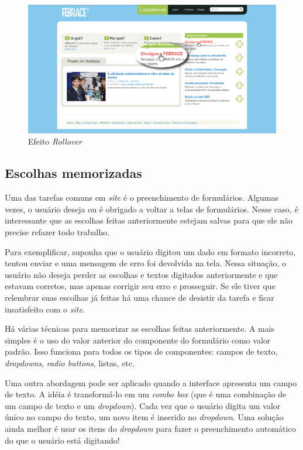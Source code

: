     \begin{figure}[h]
        \begin{center}
    \includegraphics[width=1.0\linewidth]{arquivos/rollover_effect.png}
        \end{center}
        \caption{Efeito \textit{Rollover}}
        \label{rollover_effect}
    \end{figure}

\subsection{Escolhas memorizadas}

Uma das tarefas comuns em \textit{site} é o preenchimento de formulários. Algumas vezes, o usuário deseja ou é obrigado a voltar a telas de formulários. Nesse caso, é interessante que as escolhas feitas anteriormente estejam salvas para que ele não precise refazer todo trabalho. 

Para exemplificar, suponha que o usuário digitou um dado em formato incorreto, tentou enviar e uma mensagem de erro foi devolvida na tela. Nessa situação, o usuário não deseja perder as escolhas e textos digitados anteriormente e que estavam corretos, mas apenas corrigir seu erro e prosseguir. Se ele tiver que relembrar suas escolhas já feitas há uma chance de desistir da tarefa e ficar insatisfeito com o \textit{site}.

Há várias técnicas para memorizar as escolhas feitas anteriormente. A mais simples é o uso do valor anterior do componente do formulário como valor padrão. Isso funciona para todos os tipos de componentes: campos de texto, \textit{dropdowns}, \textit{radio buttons}, listas, etc.

Uma outra abordagem pode ser aplicado quando a interface apresenta um campo de texto. A idéia é transformá-lo em um \textit{combo box} (que é uma combinação de um campo de texto e um \textit{dropdown}). Cada vez que o usuário digita um valor único no campo do texto, um novo item é inserido no \textit{dropdown}. Uma solução ainda melhor é usar os itens do \textit{dropdown} para fazer o preenchimento automático do que o usuário está digitando!

